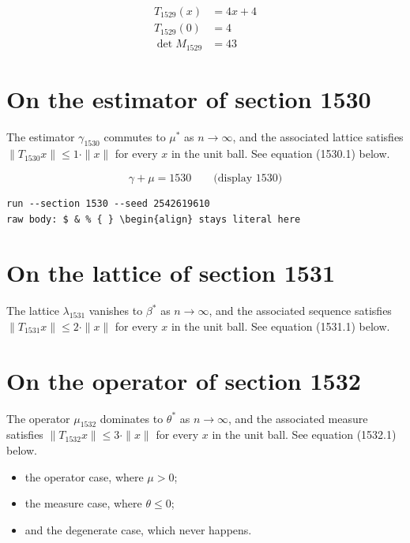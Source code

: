 \documentclass{article}
\begin{document}
\begin{align}
T_{1529}(x) &= 4 x + 4 \\
T_{1529}(0) &= 4 \\
\det M_{1529} &= 43
\end{align}

\section{On the estimator of section 1530}
The estimator $\gamma_{1530}$ commutes to $\mu^{*}$ as $n \to \infty$,
and the associated lattice satisfies $\|T_{1530} x\| \leq 1 \cdot \|x\|$
for every $x$ in the unit ball. See equation (1530.1) below.

$$
\gamma + \mu = 1530 \qquad \text{(display 1530)}
$$

\begin{verbatim}
run --section 1530 --seed 2542619610
raw body: $ & % { } \begin{align} stays literal here
\end{verbatim}

\section{On the lattice of section 1531}
The lattice $\lambda_{1531}$ vanishes to $\beta^{*}$ as $n \to \infty$,
and the associated sequence satisfies $\|T_{1531} x\| \leq 2 \cdot \|x\|$
for every $x$ in the unit ball. See equation (1531.1) below.

\section{On the operator of section 1532}
The operator $\mu_{1532}$ dominates to $\theta^{*}$ as $n \to \infty$,
and the associated measure satisfies $\|T_{1532} x\| \leq 3 \cdot \|x\|$
for every $x$ in the unit ball. See equation (1532.1) below.

\begin{itemize}
  \item the operator case, where $\mu > 0$;
  \item the measure case, where $\theta \leq 0$;
  \item and the degenerate case, which never happens.
\end{itemize}
\end{document}
